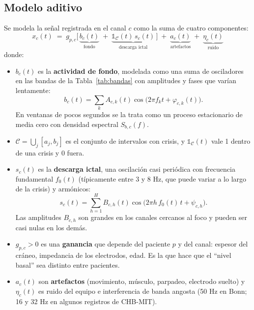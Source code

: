 \subsection{Modelo aditivo}

Se modela la señal registrada en el canal $c$ como la suma de cuatro componentes:
\begin{equation}
\boxed{\;
  x_c(t) \;=\; g_{p,c}\Big[\, \underbrace{b_c(t)}_{\text{fondo}}
  \;+\; \underbrace{\mathds{1}_{\mathcal{C}}(t)\, s_c(t)}_{\text{descarga ictal}} \,\Big]
  \;+\; \underbrace{a_c(t)}_{\text{artefactos}}
  \;+\; \underbrace{\eta_c(t)}_{\text{ruido}}
\;}
\label{eq:modelo_eeg}
\end{equation}
donde:
\begin{itemize}
  \item $b_c(t)$ es la \textbf{actividad de fondo}, modelada como una suma de osciladores en las bandas
        de la Tabla~\ref{tab:bandas} con amplitudes y fases que varían lentamente:
        \begin{equation}
          b_c(t) = \sum_{k} A_{c,k}(t) \cos\!\big(2\pi f_k t + \varphi_{c,k}(t)\big).
          \label{eq:fondo}
        \end{equation}
        En ventanas de pocos segundos se la trata como un proceso estacionario de media cero con densidad
        espectral $S_{b,c}(f)$.
  \item $\mathcal{C} = \bigcup_j [a_j, b_j]$ es el conjunto de intervalos con crisis, y
        $\mathds{1}_{\mathcal{C}}(t)$ vale 1 dentro de una crisis y 0 fuera.
  \item $s_c(t)$ es la \textbf{descarga ictal}, una oscilación casi periódica con frecuencia fundamental
        $f_0(t)$ (típicamente entre 3 y 8 Hz, que puede variar a lo largo de la crisis) y armónicos:
        \begin{equation}
          s_c(t) = \sum_{h=1}^{H} B_{c,h}(t) \cos\!\big(2\pi h\, f_0(t)\, t + \psi_{c,h}\big).
          \label{eq:descarga}
        \end{equation}
        Las amplitudes $B_{c,h}$ son grandes en los canales cercanos al foco y pueden ser casi nulas en los
        demás.
  \item $g_{p,c} > 0$ es una \textbf{ganancia} que depende del paciente $p$ y del canal: espesor del cráneo,
        impedancia de los electrodos, edad. Es la que hace que el ``nivel basal'' sea distinto entre
        pacientes.
  \item $a_c(t)$ son \textbf{artefactos} (movimiento, músculo, parpadeo, electrodo suelto) y $\eta_c(t)$ es
        ruido del equipo e interferencia de banda angosta (50 Hz en Bonn; 16 y 32 Hz en algunos registros
        de CHB-MIT).
\end{itemize}

